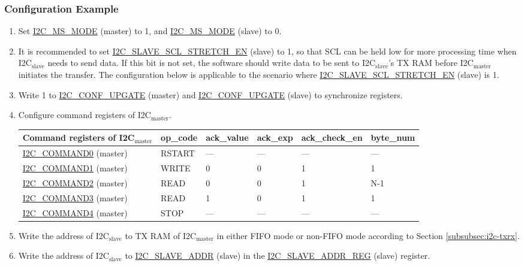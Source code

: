 \documentclass[main\_\_EN.tex]{subfiles}
\begin{document}
\subsubsection{Configuration Example}
\begin{enumerate}
\item Set \hyperref[fielddesc:I2CMSMODE]{I2C\_MS\_MODE} (master) to 1, and \hyperref[fielddesc:I2CMSMODE]{I2C\_MS\_MODE} (slave) to 0.
\item It is recommended to set \hyperref[fielddesc:I2CSLAVESCLSTRETCHEN]{I2C\_SLAVE\_SCL\_STRETCH\_EN} (slave) to 1, so that SCL can be held low for more processing time when I2C$_\text{slave}$ needs to send data. If this bit is not set, the software should write data to be sent to I2C$_\text{slave}$'s TX RAM before I2C$_\text{master}$ initiates the transfer. The configuration below is applicable to the scenario where \hyperref[fielddesc:I2CSLAVESCLSTRETCHEN]{I2C\_SLAVE\_SCL\_STRETCH\_EN} (slave) is 1.
\item Write 1 to \hyperref[fielddesc:I2CCONFUPGATE]{I2C\_CONF\_UPGATE} (master) and \hyperref[fielddesc:I2CCONFUPGATE]{I2C\_CONF\_UPGATE} (slave) to synchronize registers.
\item Configure command registers of I2C$_\text{master}$.
\begin{longtable}{ | p{4cm} | p{2cm} | p{2cm} | p{2cm} |p{2cm} | p{2cm} |}
\hline\rowcolor{lightgray}
Command registers of I2C$_\text{master}$& op\_code & ack\_value&ack\_exp&ack\_check\_en&byte\_num  \\ \hline
\hyperref[fielddesc:I2CCOMMAND0]{I2C\_COMMAND0} (master)& RSTART& ---&---&---&---  \\ \hline
\hyperref[fielddesc:I2CCOMMAND1]{I2C\_COMMAND1} (master)& WRITE& 0&0&1&1  \\ \hline
\hyperref[fielddesc:I2CCOMMAND2]{I2C\_COMMAND2} (master)& READ& 0&0&1&N-1  \\ \hline
\hyperref[fielddesc:I2CCOMMAND3]{I2C\_COMMAND3} (master)& READ& 1&0&1&1  \\ \hline
\hyperref[fielddesc:I2CCOMMAND4]{I2C\_COMMAND4} (master)& STOP& ---&---&---&---  \\ \hline
\end{longtable}
\item Write the address of I2C$_\text{slave}$ to TX RAM of I2C$_\text{master}$ in either FIFO mode or non-FIFO mode according to Section \ref{subsubsec:i2c-txrx}.
\item Write the address of I2C$_\text{slave}$ to \hyperref[fielddesc:I2CSLAVEADDR]{I2C\_SLAVE\_ADDR} (slave) in the \hyperref[regdesc:I2CSLAVEADDRREG]{I2C\_SLAVE\_ADDR\_REG} (slave) register.

\end{enumerate}
\end{document}
